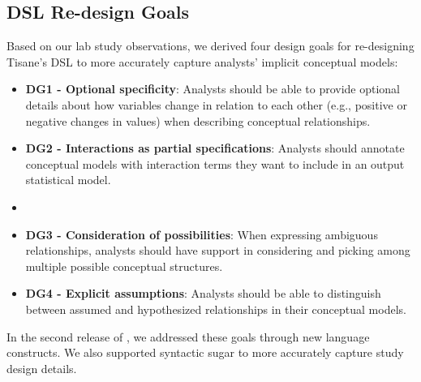 \subsection{DSL Re-design Goals} \label{sec:rtisane_design_implications} 

Based on our lab study observations, we derived four design goals for
re-designing Tisane's DSL to more accurately capture analysts' implicit
conceptual models: 

\def\optionalSpecificity{\textbf{DG1 - Optional specificity}\xspace}
\def\interactionAsPartialSpec{\textbf{DG2 - Interactions as partial specifications}\xspace}
\def\considerPossibilities{\textbf{DG3 - Consideration of possibilities}\xspace}
\def\assumeHypothesize{\textbf{DG4 - Explicit assumptions}\xspace}
\begin{itemize}
    \item \optionalSpecificity: Analysts should be able to provide optional
    details about how variables change in relation to each other (e.g., positive
    or negative changes in values) when describing conceptual relationships.
    \item \interactionAsPartialSpec: Analysts should annotate conceptual models with interaction terms they want to include in an output statistical model. 
    \item \item \considerPossibilities: When expressing ambiguous relationships, analysts should have support
    in considering and picking among multiple possible conceptual structures.
    \item \assumeHypothesize: Analysts should be able to distinguish between assumed and hypothesized relationships in their conceptual models. 
\end{itemize}

In the second release of \tisane, we addressed these goals through new language
constructs. We also supported syntactic sugar to more accurately capture
study design details. 

